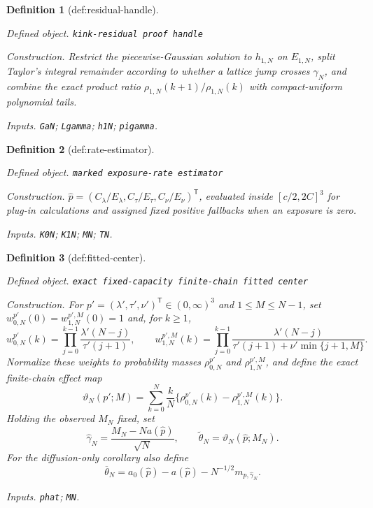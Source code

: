 \documentclass{article}
\newtheorem{definition}{Definition}
\begin{document}
\begin{definition}[def:residual-handle]\label{def:residual-handle}
\par\smallskip\noindent\emph{Defined object.} \texttt{kink-\allowbreak{}residual proof handle}
\par\smallskip\noindent\emph{Construction.} Restrict the piecewise-Gaussian solution to \(h_{1,N}\) on \(E_{1,N}\), split Taylor's integral remainder according to whether a lattice jump crosses \(\gamma_N\), and combine the exact product ratio \(\rho_{1,N}(k+1)/\rho_{1,N}(k)\) with compact-uniform polynomial tails.
\par\smallskip\noindent\emph{Inputs.} \texttt{GaN}; \texttt{Lgamma}; \texttt{h1N}; \texttt{pigamma}.
\end{definition}

\begin{definition}[def:rate-estimator]\label{def:rate-estimator}
\par\smallskip\noindent\emph{Defined object.} \texttt{marked exposure-\allowbreak{}rate estimator}
\par\smallskip\noindent\emph{Construction.} \(\widehat p=(C_\lambda/E_\lambda,C_\tau/E_\tau,C_\nu/E_\nu)^{\mathsf T}\), evaluated inside \([c/2,2C]^3\) for plug-in calculations and assigned fixed positive fallbacks when an exposure is zero.
\par\smallskip\noindent\emph{Inputs.} \texttt{K0N}; \texttt{K1N}; \texttt{MN}; \texttt{TN}.
\end{definition}

\begin{definition}[def:fitted-center]\label{def:fitted-center}
\par\smallskip\noindent\emph{Defined object.} \texttt{exact fixed-\allowbreak{}capacity finite-\allowbreak{}chain fitted center}
\par\smallskip\noindent\emph{Construction.} For \(p'=(\lambda',\tau',\nu')^{\mathsf T}\in(0,\infty)^3\) and \(1\leq M\leq N-1\), set \(w_{0,N}^{p'}(0)=w_{1,N}^{p',M}(0)=1\) and, for \(k\geq1\),
\[
 w_{0,N}^{p'}(k)=\prod_{j=0}^{k-1}\frac{\lambda'(N-j)}{\tau'(j+1)},
 \qquad
 w_{1,N}^{p',M}(k)=\prod_{j=0}^{k-1}
 \frac{\lambda'(N-j)}{\tau'(j+1)+\nu'\min\{j+1,M\}}.
\]
Normalize these weights to probability masses \(\rho_{0,N}^{p'}\) and \(\rho_{1,N}^{p',M}\), and define the exact finite-chain effect map
\[
 \vartheta_N(p';M)=\sum_{k=0}^N\frac{k}{N}
 \{\rho_{0,N}^{p'}(k)-\rho_{1,N}^{p',M}(k)\}.
\]
Holding the observed \(M_N\) fixed, set
\[
 \widehat\gamma_N=\frac{M_N-Na(\widehat p)}{\sqrt N},
 \qquad
 \widetilde\theta_N=\vartheta_N(\widehat p;M_N).
\]
For the diffusion-only corollary also define
\[
 \overline\theta_N=a_0(\widehat p)-a(\widehat p)
 -N^{-1/2}m_{\widehat p,\widehat\gamma_N}.
\]
\par\smallskip\noindent\emph{Inputs.} \texttt{phat}; \texttt{MN}.
\end{definition}
\end{document}
